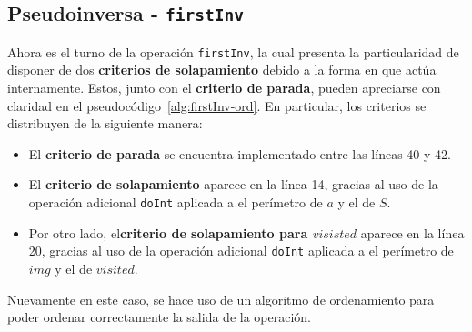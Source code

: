 \subsection{Pseudoinversa - \texttt{firstInv}}

Ahora es el turno de la operación \texttt{firstInv}, la cual presenta la particularidad 
de disponer de dos \textbf{criterios de solapamiento} debido a la forma en que actúa internamente.  
Estos, junto con el \textbf{criterio de parada}, pueden apreciarse con claridad en el pseudocódigo~\ref{alg:firstInv-ord}.  
En particular, los criterios se distribuyen de la siguiente manera:


\begin{itemize}
    \item El \textbf{criterio de parada} se encuentra implementado entre las líneas 40 y 42.
    
    \item El \textbf{criterio de solapamiento} aparece en la línea 14, gracias al uso de la operación adicional \texttt{doInt} aplicada a el perímetro de $a$ y el de $S$.

    \item Por otro lado, el\textbf{criterio de solapamiento para $visisted$} aparece en la línea 20, gracias al uso de la operación adicional \texttt{doInt} aplicada a el perímetro de $img$ y el de $visited$.
\end{itemize}

Nuevamente en este caso, se hace uso de un algoritmo de ordenamiento para poder ordenar correctamente la salida de la operación.

